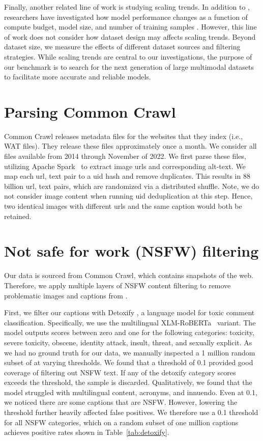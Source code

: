 Finally, another related line of work is studying scaling trends. In addition to \citet{sorscher2022beyond}, researchers have investigated how model performance changes as a function of compute budget, model size, and number of training samples \cite{kaplan2020scaling,chinchilla,caballero2022broken,cherti2022reproducible}.
However, this line of work does not consider how dataset design may affects scaling trends. 
Beyond dataset size, we measure the effects of different dataset sources and filtering strategies.
While scaling trends are central to our investigations, the purpose of our benchmark is to search for the next generation of large multimodal datasets to facilitate more accurate and reliable models.

\section{Parsing Common Crawl}
\label{app:parse-cc}
Common Crawl releases metadata files for the websites that they index (i.e., WAT files). They release these files approximately once a month. We consider all files available from 2014 through November of 2022. We first parse these files, utilizing Apache Spark~\cite{zaharia2016apache} to extract image urls and corresponding alt-text. We map each url, text pair to a uid hash and remove duplicates. This results in 88 billion url, text pairs, which are randomized via a distributed shuffle. Note, we do not consider image content when running uid deduplication at this step. Hence, two identical images with different urls and the same caption would both be retained.

\section{Not safe for work (NSFW) filtering}
\label{app:nsfw}
Our data is sourced from Common Crawl, which contains snapshots of the web. Therefore, we apply multiple layers of NSFW content filtering to remove problematic images and captions from \pool.

First, we filter our captions with Detoxify \citep{Detoxify}, a language model for toxic comment classification. Specifically, we use the multilingual XLM-RoBERTa~\cite{Conneau2019UnsupervisedCR} variant. The model outputs scores between zero and one for the following categories: toxicity, severe toxicity, obscene, identity attack, insult, threat, and sexually explicit. As we had no ground truth for our data, we manually inspected a 1 million random subset of \pool at varying thresholds. We found that a threshold of 0.1 provided good coverage of filtering out NSFW text.
If any of the detoxify category scores exceeds the threshold, the sample is discarded.
Qualitatively, we found that the model struggled with multilingual content, acronyms, and innuendo.
Even at 0.1, we noticed there are some captions that are NSFW.
However, lowering the threshold further heavily affected false positives. We therefore use a 0.1 threshold for all NSFW categories, which on a random subset of one million captions achieves positive rates shown in Table~\ref{tab:detoxify}. 

